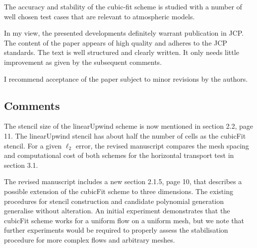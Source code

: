 \documentclass[times]{elsarticle}
\begin{document}
The accuracy and stability of the cubic-fit scheme is studied with a number of well 
chosen test cases that are relevant to atmospheric models. 

In my view, the presented developments definitely warrant publication in JCP. 
The content of the paper appears of high quality and adheres to the JCP standards. 
The text is well structured and clearly written. It only needs little improvement 
as given by the subsequent comments. 

I recommend acceptance of the paper subject to minor revisions by the authors.

\subsection*{Comments}

\begin{quotation}
\begin{comment}
\item  It is explained in various places that the cubic-fit scheme
    offers favourable computational efficiency due to the fact
    that most of the reconstruction depends on the mesh geometry
    only, and this part can be precomputed. It would be very interesting
    to see numbers in the paper. It doesn't have to be a comprehensive
    study, but just to get an impression of the cost, e.g. how does
    the runtime of the cubic-fit compare to the second-order upwind
    scheme? Or, if one runs cubic-fit and the upwind scheme such that
    both produce about the same $\ell_2$ error (by using a higher resolution
    with the upwind scheme), what is then the difference in runtime?
\end{comment}
\end{quotation}
The stencil size of the linearUpwind scheme is now mentioned in section 2.2, page 11.  The linearUpwind stencil has about half the number of cells as the cubicFit stencil.
For a given $\ell_2$ error, the revised manuscript compares the mesh spacing and computational cost of both schemes for the horizontal transport test in section 3.1.

\begin{quotation}
\begin{comment}
\item  As only 2D simulations have been considered in the paper, I
    wondered how difficult it will be to extend the cubic-fit
    scheme to 3D? It could useful to provide a short comment
    about this, just whether complications are anticipated or
    not. (See also the subsequent comment.)
\end{comment}
\end{quotation}
The revised manuscript includes a new section 2.1.5, page 10, that describes a possible extension of the cubicFit scheme to three dimensions.  The existing procedures for stencil construction and candidate polynomial generation generalise without alteration.  An initial experiment demonstrates that the cubicFit scheme works for a uniform flow on a uniform mesh, but we note that further experiments would be required to properly assess the stabilisation procedure for more complex flows and arbitrary meshes.
\end{document}

